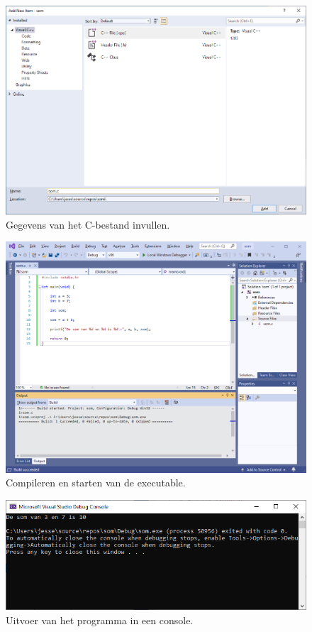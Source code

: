 \documentclass[a4paper,10pt,fleqn,twoside]{article}
\begin{document}
\begin{figure}[H]
\centering
\includegraphics[scale=0.5]{005enterfilename}
\caption{Gegevens van het C-bestand invullen.}
\label{fig:005enterfilename}
\end{figure}

\begin{figure}[H]
\centering
\includegraphics[scale=0.5]{006build}
\caption{Compileren en starten van de executable.}
\label{fig:006build}
\end{figure}

\begin{figure}[H]
\centering
\includegraphics[scale=0.5]{007output}
\caption{Uitvoer van het programma in een console.}
\label{fig:007output}
\end{figure}
\end{document}
